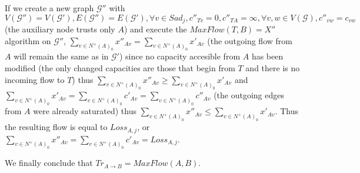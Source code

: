 \begin{itemize}
          If we create a new graph $\mathcal{G}''$ with $V(\mathcal{G}'') = V(\mathcal{G}'), E(\mathcal{G}'') =
          E(\mathcal{G}'), \forall v \in Sad_j, c''_{Tv} = 0, c''_{TA} = \infty, \forall v,w \in V(\mathcal{G}), c''_{vw} =
          c_{vw}$ (the auxiliary node trusts only $A$) and execute the $MaxFlow(T, B) = X''$ algorithm on $\mathcal{G}''$,
          $\sum\limits_{v \in N^{+}(A)_0}x''_{Av} = \sum\limits_{v \in N^{+}(A)_0}x'_{Av}$ (the outgoing flow from
          $A$ will remain the same as in $\mathcal{G}'$) since no capacity accesible from $A$ has been modified (the only
          changed capacities are those that begin from $T$ and there is no incoming flow to $T$) thus $\sum\limits_{v \in
          N^{+}(A)_0}x''_{Av} \geq \sum\limits_{v \in N^{+}(A)_0}x'_{Av}$ and $\sum\limits_{v \in N^{+}(A)_0}x'_{Av} =
          \sum\limits_{v \in N^{+}(A)_0}c'_{Av} = \sum\limits_{v \in N^{+}(A)_0}c''_{Av}$ (the outgoing edges from $A$ were
          already saturated) thus $\sum\limits_{v \in N^{+}(A)_0}x''_{Av} \leq \sum\limits_{v \in N^{+}(A)_0}x'_{Av}$. Thus
          the resulting flow is equal to $Loss_{A, j}$, or $\sum\limits_{v \in N^{+}(A)_0}x''_{Av} = \sum\limits_{v \in
          N^{+}(A)_0}c'_{Av} = Loss_{A, j}$.
       \end{itemize}
       We finally conclude that $Tr_{A \rightarrow B} = MaxFlow(A, B)$.
